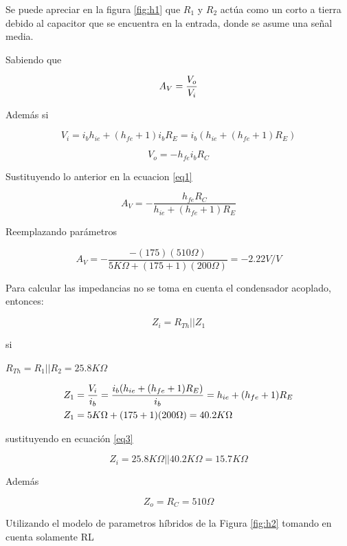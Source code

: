 \documentclass[12pt, a4paper]{article}
\begin{document}
    Se puede apreciar en la figura \ref{fig:h1} que $R_1$ y $R_2$ actúa como un corto a tierra debido al capacitor que se encuentra en la entrada, donde se asume una señal media.

    Sabiendo que

    \begin{equation}
        A_V = {V_o \over V_i}
        \label{eq1}
    \end{equation}

    Además si

    $$V_i = i_bh_{ie} + (h_{fe}+1)i_bR_E = i_b(h_{ie} + (h_{fe}+1)R_E)$$

    $$V_o = -h_{fe}i_bR_C$$

    Sustituyendo lo anterior en la ecuacion \eqref{eq1}

    \begin{equation}
        A_V = -\frac{h_{fe}R_C}{h_{ie} + (h_{fe}+1)R_E}
        \label{eq2}
    \end{equation}

    Reemplazando parámetros

    $$A_V = -\frac{-(175)(510\Omega)}{5K\Omega + (175+1)(200\Omega)} = -2.22 V/V$$

    Para calcular las impedancias no se toma en cuenta el condensador acoplado, entonces:

    \begin{equation}
        Z_i = R_{Th}||Z_1
        \label{eq3}
    \end{equation}

    si

    $R_{Th} = R_1||R_2 = 25.8K\Omega$

    \begin{equation*}
        \begin{split}
            Z_1 & = {V_i \over i_b} = \frac{i_b(h_{ie} + (h_{fe}+1)R_E)}{i_b} = h_{ie} + (h_{fe}+1)R_E \\
            Z_1 & = 5K\Omega + (175+1)(200\Omega) = 40.2K\Omega
        \end{split}
    \end{equation*}

    sustituyendo en ecuación \eqref{eq3}

    $$Z_i = 25.8K\Omega||40.2K\Omega = 15.7K\Omega$$

    Además

    $$Z_o = R_C = 510\Omega$$
    
    Utilizando el modelo de parametros híbridos de la Figura \ref{fig:h2} tomando en cuenta solamente RL
\end{document}
